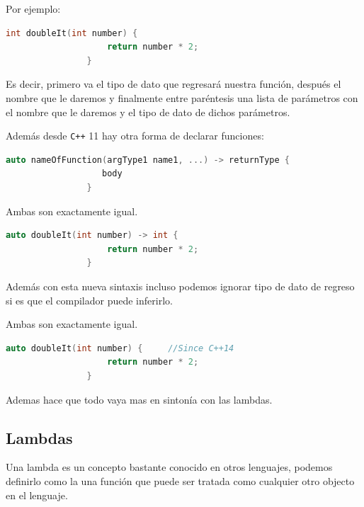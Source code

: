 \documentclass[12pt, fleqn]{report}                             %
\theoremstyle{break}                                            %
\newcommand{\textCode}[1]  { \texttt{#1} }                      %
\newcommand{\Cpp}{\ignorespaces\textCode{C++}}                  %
\begin{document}
            Por ejemplo:
            \begin{lstlisting}[language=C++, gobble=16]
                int doubleIt(int number) {
                    return number * 2;
                }
            \end{lstlisting}

            Es decir, primero va el tipo de dato que regresará nuestra función, después el nombre que le
            daremos y finalmente entre paréntesis una lista de parámetros con el nombre que le daremos y el
            tipo de dato de dichos parámetros.

            Además desde \Cpp 11 hay otra forma de declarar funciones:
            \begin{lstlisting}[language=C++, gobble=16]
                auto nameOfFunction(argType1 name1, ...) -> returnType {
                   body
                }
            \end{lstlisting}

            Ambas son exactamente igual.
            \begin{lstlisting}[language=C++, gobble=16]
                auto doubleIt(int number) -> int {
                    return number * 2;
                }
            \end{lstlisting}

            Además con esta nueva sintaxis incluso podemos ignorar tipo de dato de regreso si es que el
            compilador puede inferirlo.

            Ambas son exactamente igual.
            \begin{lstlisting}[language=C++, gobble=16]
                auto doubleIt(int number) {     //Since C++14
                    return number * 2;
                }
            \end{lstlisting}

            Ademas hace que todo vaya mas en sintonía con las lambdas.

            
            \clearpage
            \subsection{Lambdas}

                Una lambda es un concepto bastante conocido en otros lenguajes, podemos definirlo como 
                la una función que puede ser tratada como cualquier otro objecto en el lenguaje.
\end{document}
